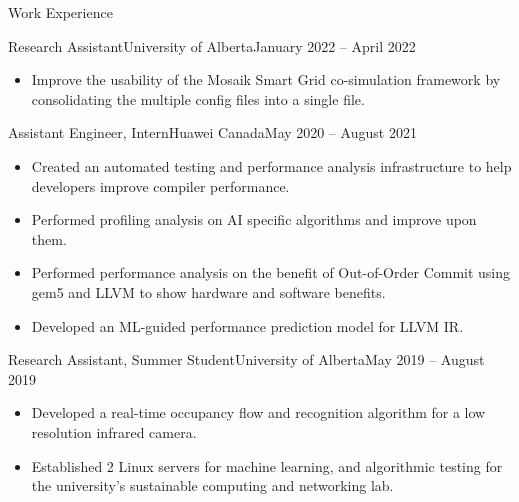 \documentclass[]{mcdowellcv}
\begin{document}
\vspace*{-10pt}
\begin{cvsection}{Work Experience}
  \begin{cvsubsection}{Research Assistant}{University of Alberta}{January 2022 -- April 2022}
      \begin{itemize}
        \item Improve the usability of the Mosaik Smart Grid co-simulation framework by consolidating the multiple config files into a single file.
      \end{itemize}
    \end{cvsubsection}

  \begin{cvsubsection}{Assistant Engineer, Intern}{Huawei Canada}{May 2020 -- August 2021}
    \begin{itemize}
      \item Created an automated testing and performance analysis infrastructure to help developers improve compiler performance.
      \item Performed profiling analysis on AI specific algorithms and improve upon them.
      \item Performed performance analysis on the benefit of Out-of-Order Commit using gem5 and LLVM to show hardware and software benefits.
      \item Developed an ML-guided performance prediction model for LLVM IR.
    \end{itemize}
  \end{cvsubsection}
  
  \begin{cvsubsection}{Research Assistant, Summer Student}{University of Alberta}{May 2019 -- August 2019}
    \vspace*{8pt}		
    \begin{itemize}
      \item Developed a real-time occupancy flow and recognition algorithm for a low resolution infrared camera.
      \item Established 2 Linux servers for machine learning, and algorithmic testing for the university's sustainable computing and networking lab.
    \end{itemize}
  \end{cvsubsection}
 

\end{cvsection}
\end{document}
